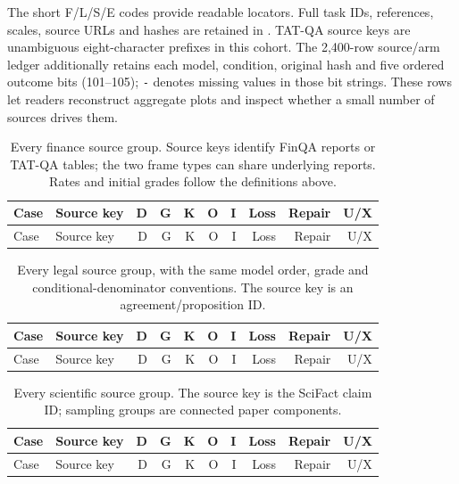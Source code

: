 The short F/L/S/E codes provide readable locators. Full task IDs, references,
scales, source URLs and hashes are retained in .
TAT-QA source keys are unambiguous eight-character prefixes in this cohort.
The 2,400-row source/arm ledger additionally retains each model, condition,
original hash and five ordered outcome bits (101--105); \texttt{-} denotes missing
values in those bit strings. These rows let readers reconstruct aggregate
plots and inspect whether a small number of sources drives them.

\begingroup\small\setlength{\tabcolsep}{3pt}
\begin{longtable}{lp{.26\linewidth}rrrrrrrr}
\caption{Every finance source group. Source keys identify FinQA reports or
TAT-QA tables; the two frame types can share underlying reports. Rates and
initial grades follow the definitions above.}
\label{tab:diagnostic-ledger-finance}\\
\toprule Case & Source key & D & G & K & O & I & Loss & Repair & U/X\\\midrule\endfirsthead
\toprule Case & Source key & D & G & K & O & I & Loss & Repair & U/X\\\midrule\endhead

\bottomrule\end{longtable}\endgroup
\begingroup\small\setlength{\tabcolsep}{3pt}
\begin{longtable}{lp{.26\linewidth}rrrrrrrr}
\caption{Every legal source group, with the same model order, grade and
conditional-denominator conventions. The source key is an agreement/proposition ID.}
\label{tab:diagnostic-ledger-legal}\\
\toprule Case & Source key & D & G & K & O & I & Loss & Repair & U/X\\\midrule\endfirsthead
\toprule Case & Source key & D & G & K & O & I & Loss & Repair & U/X\\\midrule\endhead

\bottomrule\end{longtable}\endgroup
\begingroup\small\setlength{\tabcolsep}{3pt}
\begin{longtable}{lp{.26\linewidth}rrrrrrrr}
\caption{Every scientific source group. The source key is the SciFact claim
ID; sampling groups are connected paper components.}
\label{tab:diagnostic-ledger-science}\\
\toprule Case & Source key & D & G & K & O & I & Loss & Repair & U/X\\\midrule\endfirsthead
\toprule Case & Source key & D & G & K & O & I & Loss & Repair & U/X\\\midrule\endhead

\bottomrule\end{longtable}\endgroup
